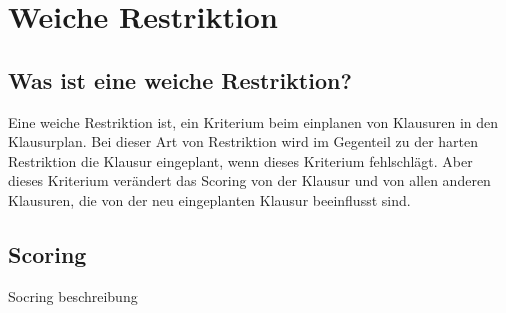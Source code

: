 \section{Weiche Restriktion}\label{sec:Weiche Restriktion}

\subsection{Was ist eine weiche Restriktion?}
Eine weiche Restriktion ist, ein Kriterium beim einplanen von Klausuren in den Klausurplan.
Bei dieser Art von Restriktion wird im Gegenteil zu der harten Restriktion die Klausur eingeplant,
wenn dieses Kriterium fehlschlägt.
Aber dieses Kriterium verändert das Scoring von der Klausur und von allen anderen Klausuren, die von
der neu eingeplanten Klausur beeinflusst sind.

\subsection{Scoring}
Socring beschreibung

